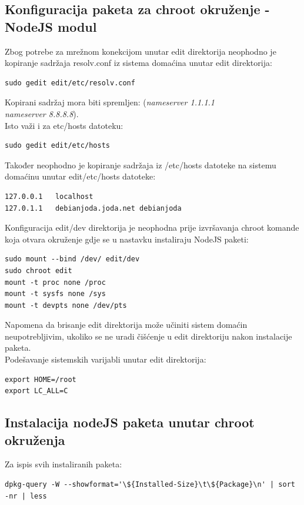 \documentclass[12pt,vi]{mitthesis}
\begin{document}
\subsection*{Konfiguracija paketa za chroot okruženje - NodeJS modul}
\indent
Zbog potrebe za mrežnom konekcijom unutar edit direktorija neophodno je kopiranje sadržaja resolv.conf iz sistema domaćina unutar edit direktorija:
\begin{lstlisting}[style=BashInputStyle]
sudo gedit edit/etc/resolv.conf
\end{lstlisting}
Kopirani sadržaj mora biti spremljen:
(\textit{nameserver 1.1.1.1 \\
nameserver 8.8.8.8}).\\
\noindent
Isto važi i za etc/hosts datoteku:
\begin{lstlisting}[style=BashInputStyle]
sudo gedit edit/etc/hosts
\end{lstlisting}
Također neophodno je kopiranje sadržaja iz /etc/hosts datoteke na sistemu domaćinu unutar edit/etc/hosts datoteke:
\begin{lstlisting}
127.0.0.1	localhost
127.0.1.1	debianjoda.joda.net	debianjoda
\end{lstlisting}

\noindent
Konfiguracija edit/dev direktorija je neophodna prije izvršavanja chroot komande koja otvara okruženje gdje se u nastavku instaliraju NodeJS paketi:
\begin{lstlisting}[style=BashInputStyle]
sudo mount --bind /dev/ edit/dev
sudo chroot edit
mount -t proc none /proc
mount -t sysfs none /sys
mount -t devpts none /dev/pts
\end{lstlisting}
Napomena da brisanje edit direktorija može učiniti sistem domaćin neupotrebljivim, ukoliko se ne uradi čišćenje u edit direktoriju nakon instalacije paketa.\\
\noindent
Podešavanje sistemskih varijabli unutar edit direktorija:
\begin{lstlisting}[style=BashInputStyle]
export HOME=/root
export LC_ALL=C
\end{lstlisting}

\subsection*{Instalacija nodeJS paketa unutar chroot okruženja}
\indent
Za ispis svih instaliranih paketa:
\begin{lstlisting}[style=BashInputStyle]
dpkg-query -W --showformat='\${Installed-Size}\t\${Package}\n' | sort -nr | less
\end{lstlisting}
\end{document}
